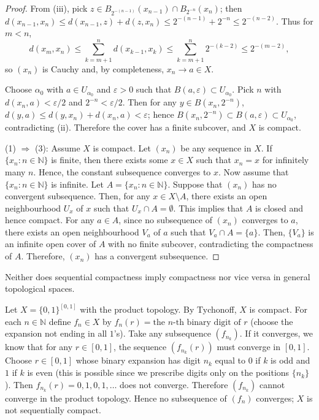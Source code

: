 \begin{proof}
    From (iii), pick \(z\in B_{2^{-(n-1)}}(x_{n-1})\cap B_{2^{-n}}(x_n)\); then
    \(d(x_{n-1},x_n)\le d(x_{n-1},z)+d(z,x_n)\le 2^{-(n-1)}+2^{-n}\le 2^{-(n-2)}\).
    Thus for \(m<n\),
    \[
    d(x_m,x_n)\le\sum_{k=m+1}^n d(x_{k-1},x_k)\le\sum_{k=m+1}^n 2^{-(k-2)}\le 2^{-(m-2)},
    \]
    so \((x_n)\) is Cauchy and, by completeness, \(x_n\to a\in X\).

    Choose \(\alpha_0\) with \(a\in U_{\alpha_0}\) and \(\varepsilon>0\) such that \(B(a,\varepsilon)\subset U_{\alpha_0}\).
    Pick \(n\) with \(d(x_n,a)<\varepsilon/2\) and \(2^{-n}<\varepsilon/2\). Then for any \(y\in B(x_n,2^{-n})\),
    \(d(y,a)\le d(y,x_n)+d(x_n,a)<\varepsilon\); hence
    \(B(x_n,2^{-n})\subset B(a,\varepsilon)\subset U_{\alpha_0}\),
    contradicting (ii). Therefore the cover has a finite subcover, and \(X\) is compact.

    (1) \(\Rightarrow\) (3): Assume \(X\) is compact. Let \((x_n)\) be any sequence in \(X\). If \(\{x_n:n\in\mathbb{N}\}\) is finite, then there exists some \(x\in X\) such that \(x_n=x\) for infinitely many \(n\). Hence, the constant subsequence converges to \(x\). Now assume that \(\{x_n:n\in\mathbb{N}\}\) is infinite. Let \(A=\{x_n:n\in\mathbb{N}\}\). Suppose that $(x_n)$ has no convergent subsequence. Then, for any $x\in X\setminus A$, there exists an open neighbourhood $U_x$ of $x$ such that $U_x\cap A=\emptyset$. This implies that $A$ is closed and hence compact. For any $a\in A$, since no subsequence of $(x_n)$ converges to $a$, there exists an open neighbourhood $V_a$ of $a$ such that $V_a\cap A=\{a\}$. Then, $\{V_a\}$ is an infinite open cover of $A$ with no finite subcover, contradicting the compactness of $A$. Therefore, $(x_n)$ has a convergent subsequence.

    \end{proof}




Neither does sequential compactness imply compactness nor vice versa in general topological spaces. 

\begin{example}
Let $X=\{0,1\}^{[0,1]}$ with the product topology. By Tychonoff, $X$ is compact. For each $n\in\mathbb{N}$ define $f_n\in X$ by
$f_n(r)=\text{the $n$-th binary digit of }r$ (choose the expansion not ending in all $1$'s).
Take any subsequence $(f_{n_k})$. If it converges, we know that for any $r\in [0,1]$, the sequence $(f_{n_k}(r))$ must converge in $[0,1]$. Choose $r\in [0,1]$ whose binary expansion has digit $n_k$ equal to $0$ if $k$ is odd and $1$ if $k$ is even (this is possible since we prescribe digits only on the positions $\{n_k\}$). Then
$f_{n_k}(r)=0,1,0,1,\dots$ does not converge. Therefore $(f_{n_k})$ cannot converge in the product topology. Hence no subsequence of $(f_n)$ converges; $X$ is not sequentially compact.
\end{example}

